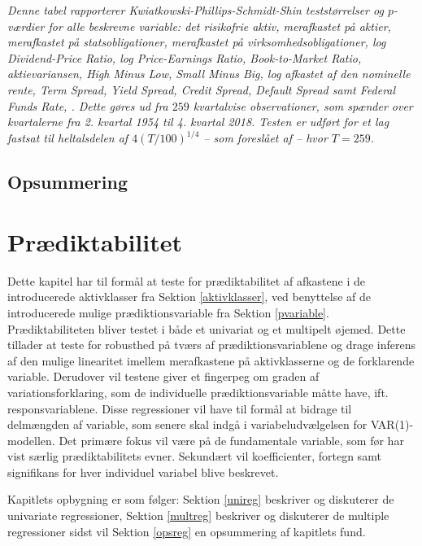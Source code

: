 \documentclass[
  a4paper,
  oneside]{memoir}
\begin{document}
\begin{table}[!h]
\begin{threeparttable}
\begin{tablenotes}
\item \textit{Denne tabel rapporterer Kwiatkowski-Phillips-Schmidt-Shin teststørrelser og $p$-værdier for alle beskrevne variable: det risikofrie aktiv, merafkastet på aktier, merafkastet på statsobligationer, merafkastet på virksomhedsobligationer, log Dividend-Price Ratio, log Price-Earnings Ratio, Book-to-Market Ratio, aktievariansen, High Minus Low, Small Minus Big, log afkastet af den nominelle rente, Term Spread, Yield Spread, Credit Spread, Default Spread samt Federal Funds Rate, \citep{Kwiatkowski1992}. Dette gøres ud fra $259$ kvartalvise observationer, som spænder over kvartalerne fra 2. kvartal 1954 til 4. kvartal 2018. Testen er udført for et lag fastsat til heltalsdelen af $4(T/100)^{1/4}$ -- som foreslået af \citep{Schwert1989} -- hvor $T=259$.}
\end{tablenotes}
\end{threeparttable}
\end{table}

\hypertarget{ops}{%
\section{Opsummering}\label{ops}}

\hypertarget{pruxe6diktabilitet}{%
\chapter{Prædiktabilitet}\label{pruxe6diktabilitet}}

Dette kapitel har til formål at teste for prædiktabilitet af afkastene i de introducerede aktivklasser fra Sektion \ref{aktivklasser}, ved benyttelse af de introducerede mulige prædiktionsvariable fra Sektion \ref{pvariable}. Prædiktabiliteten bliver testet i både et univariat og et multipelt øjemed. Dette tillader at teste for robusthed på tværs af prædiktionsvariablene og drage inferens af den mulige linearitet imellem merafkastene på aktivklasserne og de forklarende variable. Derudover vil testene giver et fingerpeg om graden af variationsforklaring, som de individuelle prædiktionsvariable måtte have, ift. responsvariablene. Disse regressioner vil have til formål at bidrage til delmængden af variable, som senere skal indgå i variabeludvælgelsen for VAR(1)-modellen. Det primære fokus vil være på de fundamentale variable, som før har vist særlig prædiktabilitets evner. Sekundært vil koefficienter, fortegn samt signifikans for hver individuel variabel blive beskrevet.

Kapitlets opbygning er som følger: Sektion \ref{unireg} beskriver og diskuterer de univariate regressioner, Sektion \ref{multreg} beskriver og diskuterer de multiple regressioner sidst vil Sektion \ref{opsreg} en opsummering af kapitlets fund.
\end{document}

